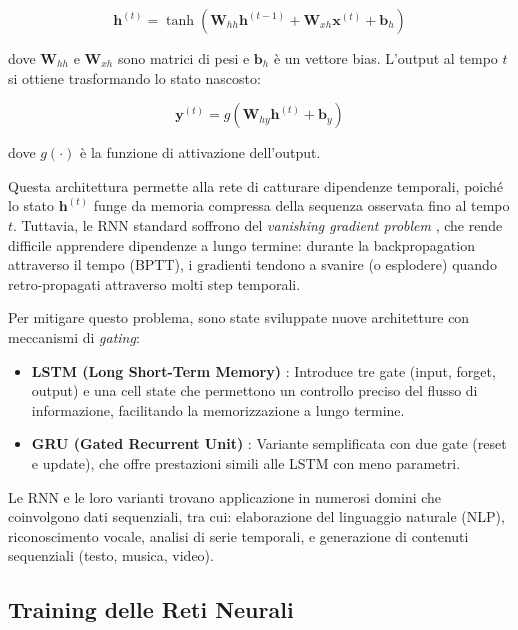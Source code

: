 \begin{equation}
\mathbf{h}^{(t)} = \tanh(\mathbf{W}_{hh} \mathbf{h}^{(t-1)} + \mathbf{W}_{xh} \mathbf{x}^{(t)} + \mathbf{b}_h)
\label{eq:rnn_explicit}
\end{equation}

dove $\mathbf{W}_{hh}$ e $\mathbf{W}_{xh}$ sono matrici di pesi e $\mathbf{b}_h$ è un vettore bias. L'output al tempo $t$ si ottiene trasformando lo stato nascosto:

\begin{equation}
\mathbf{y}^{(t)} = g(\mathbf{W}_{hy} \mathbf{h}^{(t)} + \mathbf{b}_y)
\end{equation}

dove $g(\cdot)$ è la funzione di attivazione dell'output.

Questa architettura permette alla rete di catturare dipendenze temporali, poiché lo stato $\mathbf{h}^{(t)}$ funge da memoria compressa della sequenza osservata fino al tempo $t$. Tuttavia, le RNN standard soffrono del \textit{vanishing gradient problem} \cite{bengio1994learning}, che rende difficile apprendere dipendenze a lungo termine: durante la backpropagation attraverso il tempo (BPTT), i gradienti tendono a svanire (o esplodere) quando retro-propagati attraverso molti step temporali.

Per mitigare questo problema, sono state sviluppate nuove architetture con meccanismi di \textit{gating}:

\begin{itemize}
\item \textbf{LSTM (Long Short-Term Memory)} \cite{hochreiter1997long}: Introduce tre gate (input, forget, output) e una cell state che permettono un controllo preciso del flusso di informazione, facilitando la memorizzazione a lungo termine.

\item \textbf{GRU (Gated Recurrent Unit)} \cite{cho2014learning}: Variante semplificata con due gate (reset e update), che offre prestazioni simili alle LSTM con meno parametri.
\end{itemize}

Le RNN e le loro varianti trovano applicazione in numerosi domini che coinvolgono dati sequenziali, tra cui: elaborazione del linguaggio naturale (NLP), riconoscimento vocale, analisi di serie temporali, e generazione di contenuti sequenziali (testo, musica, video).


\subsection{Training delle Reti Neurali}
\label{sec:training}


